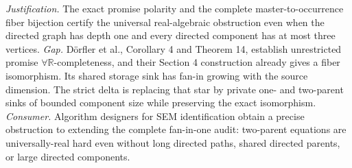 \documentclass{article}
\begin{document}
\par\smallskip\noindent \textit{Justification.} The exact promise polarity and the complete master-to-occurrence fiber bijection certify the universal real-algebraic obstruction even when the directed graph has depth one and every directed component has at most three vertices. \textit{Gap.} Dörfler et al., Corollary 4 and Theorem 14, establish unrestricted promise \(\forall\mathbb R\)-completeness, and their Section 4 construction already gives a fiber isomorphism. Its shared storage sink has fan-in growing with the source dimension. The strict delta is replacing that star by private one- and two-parent sinks of bounded component size while preserving the exact isomorphism. \textit{Consumer.} Algorithm designers for SEM identification obtain a precise obstruction to extending the complete fan-in-one audit: two-parent equations are universally-real hard even without long directed paths, shared directed parents, or large directed components.
\end{document}

